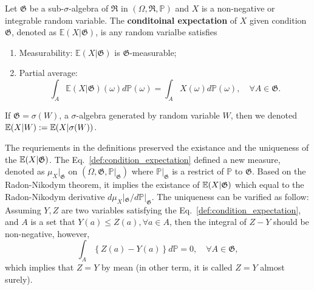 \begin{definition}
Let $\mathfrak{G}$ be a sub-$\sigma$-algebra of $\mathfrak{R}$ in $(\Omega, \mathfrak{R},\mathbb{P})$ and $X$ is a non-negative or integrable random variable. The \textbf{conditoinal expectation} of $X$ given condition $\mathfrak{G}$, denoted as $\mathbb{E}(X|\mathfrak{G})$, is any random varialbe satisfies
\begin{enumerate}
\item Measurability: $\mathbb{E}(X|\mathfrak{G})$ is $\mathfrak{G}$-measurable;
\item Partial average:
\begin{equation}
\int_{A} \mathbb{E}(X|\mathfrak{G})(\omega)d\mathbb{P}(\omega) = \int_{A}X(\omega)d\mathbb{P}(\omega), \quad \forall A\in\mathfrak{G}.
\label{def:condition_expectation}
\end{equation}
\end{enumerate}
If $\mathfrak{G}=\sigma(W)$, a $\sigma$-algebra generated by random variable $W$, then we denoted $\mathbb{E}(X|W):=\mathbb{E}(X|\sigma(W))$.
\end{definition}

The requriements in the definitions preserved the existance and the uniqueness of the $\mathbb{E}(X|\mathfrak{G})$. The Eq.~\ref{def:condition_expectation} defined a new measure, denoted as $\mu_X|_\mathfrak{G}$ on $(\Omega,\mathfrak{G},\mathbb{P}|_\mathfrak{G})$ where $\mathbb{P}|_\mathfrak{G}$ is a restrict of $\mathbb{P}$ to $\mathfrak{G}$. Based on the Radon-Nikodym theorem, it implies the existance of $\mathbb{E}(X|\mathfrak{G})$ which equal to the Radon-Nikodym derivative $d\mu_X|_\mathfrak{G}/d\mathbb{P}|_\mathfrak{G}$. The uniqueness can be varified as follow: Assuming $Y,Z$ are two variables satisfying the Eq.~\ref{def:condition_expectation}, and $A$ is a set that $Y(a)\le Z(a),\forall a\in A$, then the integral of $Z-Y$ should be non-negative, however, 
\begin{equation*}
\int_A \left\{Z(a)-Y(a)\right\}d\mathbb{P} = 0,\quad \forall A\in\mathfrak{G},
\end{equation*}
which implies that $Z=Y$ by mean (in other term, it is called $Z=Y$ almost surely).

